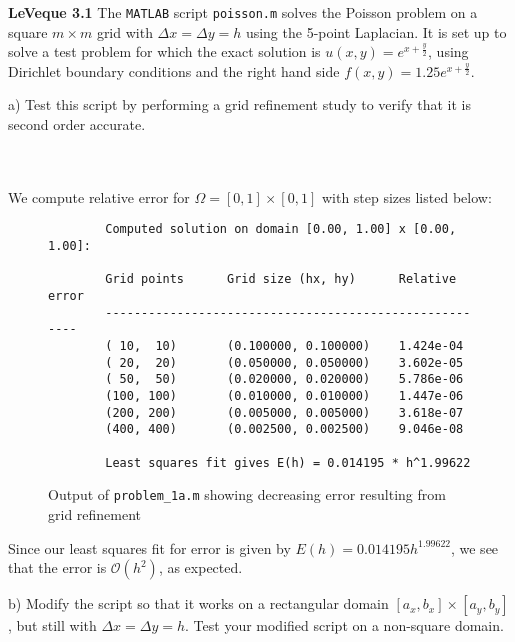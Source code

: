 \textbf{LeVeque 3.1} The \texttt{MATLAB} script \texttt{poisson.m} solves the Poisson problem on a square $m \times m$ 
grid with $\Delta x = \Delta y = h $ using the 5-point Laplacian. It is set up to solve a test problem for which the 
exact solution is $u(x, y) = e^{x + \frac{y}{2}}$, using Dirichlet boundary conditions and the right hand side 
$f(x, y) = 1.25 e^{x + \frac{y}{2}}$.

a) Test this script by performing a grid refinement study to verify that it is second order accurate.

\begin{solution}\ \\\\
    We compute relative error for $\Omega = [0, 1] \times [0, 1]$ with step sizes listed below:

    \begin{figure}[h]
        \begin{lstlisting}
        Computed solution on domain [0.00, 1.00] x [0.00, 1.00]: 
 
        Grid points      Grid size (hx, hy)      Relative error
        -------------------------------------------------------
        ( 10,  10)       (0.100000, 0.100000)    1.424e-04 
        ( 20,  20)       (0.050000, 0.050000)    3.602e-05 
        ( 50,  50)       (0.020000, 0.020000)    5.786e-06 
        (100, 100)       (0.010000, 0.010000)    1.447e-06 
        (200, 200)       (0.005000, 0.005000)    3.618e-07 
        (400, 400)       (0.002500, 0.002500)    9.046e-08 
             
        Least squares fit gives E(h) = 0.014195 * h^1.99622
        \end{lstlisting}
        \caption{Output of \texttt{problem\_1a.m} showing decreasing error resulting from grid refinement}
    \end{figure}

    Since our least squares fit for error is given by $E(h) = 0.014195 h^{1.99622}$, we see that the error is 
    $\mathcal{O}(h^2)$, as expected.
    \ \\
\end{solution}

\pagebreak
b) Modify the script so that it works on a rectangular domain $[a_x, b_x] \times [a_y, b_y]$, but still with
   $\Delta x = \Delta y = h$. Test your modified script on a non-square domain.

